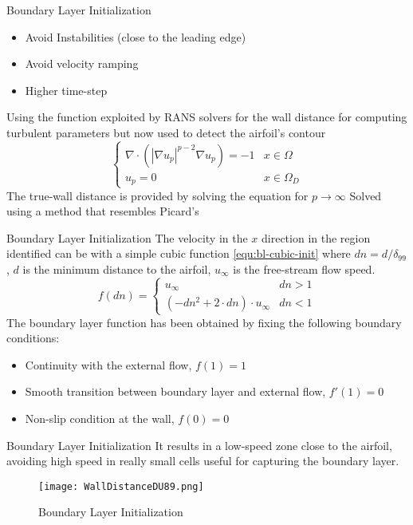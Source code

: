 \begin{frame}{Boundary Layer Initialization}
\begin{itemize}
\item Avoid Instabilities (close to the leading edge)
\item Avoid velocity ramping
\item Higher time-step
\end{itemize}
Using the function exploited by RANS solvers for the wall distance for computing turbulent parameters but now used to detect the airfoil's contour
\begin{equation}
\begin{cases}
    \nabla \cdot (|\nabla u_p|^{p-2} \nabla u_p) = -1 & x\in \Omega\\
    u_p = 0 & x\in \Omega_D
    \end{cases}
    \label{equ:ppoisson}
\end{equation}
The true-wall distance is provided by solving the equation for $p\xrightarrow{}\infty$
Solved using a method that resembles Picard's
\end{frame}

\begin{frame}{Boundary Layer Initialization}
The velocity in the $x$ direction in the region identified can be with a simple cubic function \eqref{equ:bl-cubic-init} where $dn = d/\delta_{99}$, $d$ is the minimum distance to the airfoil, $u_\infty$ is the free-stream flow speed.
\begin{equation}
    f(dn) = 
    \begin{cases}
        u_\infty & dn>1\\
        ( -dn^2+2\cdot dn )\cdot u_\infty &  dn<1
    \end{cases}
    \label{equ:bl-cubic-init}
\end{equation}
 The boundary layer function has been obtained by fixing the following boundary conditions:
\begin{itemize}
    \item Continuity with the external flow, $f(1)=1$ 
    \item Smooth transition between boundary layer and external flow, $f'(1)=0$ 
    \item Non-slip condition at the wall, $f(0)=0$
\end{itemize}
\end{frame}

\begin{frame}{Boundary Layer Initialization}
It results in a low-speed zone close to the airfoil, avoiding high speed in really small cells useful for capturing the boundary layer.
\begin{figure}
         \centering
         \texttt{[image: WallDistanceDU89.png]}
         \caption{Boundary Layer Initialization}
         \label{fig:wall-distance-init}
\end{figure} 
\end{frame}
